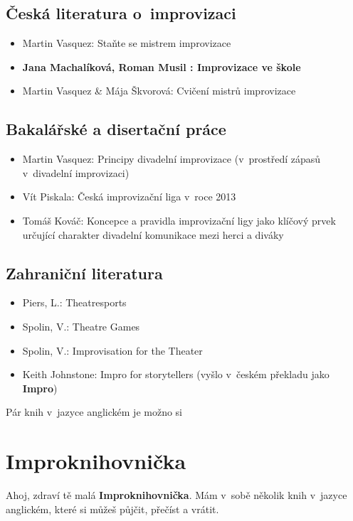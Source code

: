 \subsection{ Česká literatura o~improvizaci } \begin{itemize}
\item  Martin Vasquez: Staňte se mistrem improvizace
\item  \textbf{ Jana Machalíková, Roman Musil : Improvizace ve škole}
\item  Martin Vasquez & Mája Škvorová: Cvičení mistrů improvizace
\end{itemize}
 
\subsection{ Bakalářské a disertační práce } \begin{itemize}
\item  Martin Vasquez: Principy  divadelní  improvizace  (v~prostředí  zápasů  v~divadelní improvizaci)
\item  Vít Piskala: Česká improvizační liga v~roce 2013
\item  Tomáš Kováč: Koncepce a pravidla improvizační ligy jako klíčový prvek určující charakter divadelní komunikace mezi herci a diváky
\end{itemize}
 
\subsection{ Zahraniční literatura } \begin{itemize}
\item  Piers, L.: Theatresports
\item  Spolin, V.: Theatre Games
\item  Spolin, V.: Improvisation for the Theater
\item  Keith Johnstone: Impro for storytellers  (vyšlo v~českém překladu  jako \textbf{Impro})
\end{itemize}
 
Pár knih v~jazyce anglickém je možno si  
\needspace{5cm} \section{Improknihovnička} \label{improknihovnička} Ahoj, 
zdraví tě malá \textbf{Improknihovnička}. 
Mám v~sobě několik knih v~jazyce anglickém, které si můžeš půjčit, přečíst a vrátit. 
  
